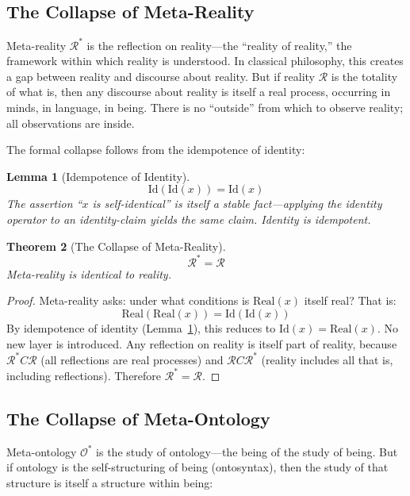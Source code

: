 \documentclass[12pt, letterpaper]{book}
\def\equiv{=}%
\def\subset{C}%
\newtheorem{theorem}{Theorem}[chapter]
\newtheorem{lemma}[theorem]{Lemma}
\begin{document}
\subsection{The Collapse of Meta-Reality}

Meta-reality $\mathcal{R}^*$ is the reflection on reality---the ``reality of reality,'' the framework within which reality is understood. In classical philosophy, this creates a gap between reality and discourse about reality. But if reality $\mathcal{R}$ is the totality of what is, then any discourse about reality is itself a real process, occurring in minds, in language, in being. There is no ``outside'' from which to observe reality; all observations are inside.

The formal collapse follows from the idempotence of identity:

\begin{lemma}[Idempotence of Identity]\label{lem:idempotent}
\[
\mathrm{Id}(\mathrm{Id}(x)) \equiv \mathrm{Id}(x)
\]
The assertion ``$x$ is self-identical'' is itself a stable fact---applying the identity operator to an identity-claim yields the same claim. Identity is idempotent.
\end{lemma}

\begin{theorem}[The Collapse of Meta-Reality]\label{thm:meta-reality}
\[
\boxed{\mathcal{R}^* \equiv \mathcal{R}}
\]
Meta-reality is identical to reality.
\end{theorem}

\begin{proof}
Meta-reality asks: under what conditions is $\mathrm{Real}(x)$ itself real? That is:
\[
\mathrm{Real}(\mathrm{Real}(x)) \equiv \mathrm{Id}(\mathrm{Id}(x))
\]
By idempotence of identity (Lemma~\ref{lem:idempotent}), this reduces to $\mathrm{Id}(x) \equiv \mathrm{Real}(x)$. No new layer is introduced. Any reflection on reality is itself part of reality, because $\mathcal{R}^* \subset \mathcal{R}$ (all reflections are real processes) and $\mathcal{R} \subset \mathcal{R}^*$ (reality includes all that is, including reflections). Therefore $\mathcal{R}^* \equiv \mathcal{R}$.
\end{proof}

\subsection{The Collapse of Meta-Ontology}

Meta-ontology $\mathcal{O}^*$ is the study of ontology---the being of the study of being. But if ontology is the self-structuring of being (ontosyntax), then the study of that structure is itself a structure within being:
\end{document}
